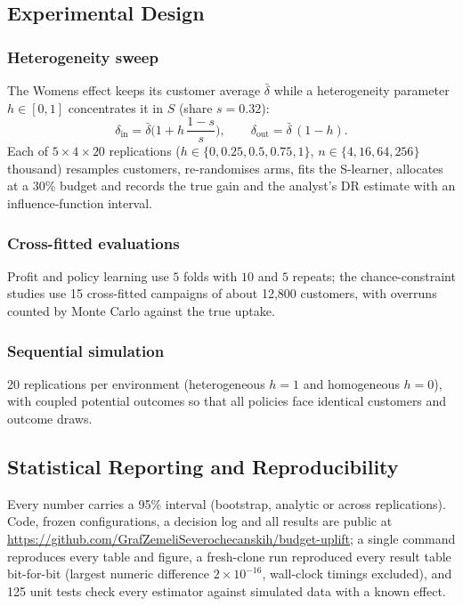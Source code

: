 \documentclass[10pt,twocolumn]{article}
\newcommand{\repourl}{\url{https://github.com/GrafZemeliSeverochecanskih/budget-uplift}}
\begin{document}
\subsection{Experimental Design}
\subsubsection{Heterogeneity sweep}
The Womens effect keeps its customer average $\bar\delta$ while a heterogeneity parameter
$h\in[0,1]$ concentrates it in $S$ (share $s=0.32$):
\begin{equation}
  \delta_{\text{in}} = \bar\delta\Big(1+h\,\frac{1-s}{s}\Big), \qquad \delta_{\text{out}} = \bar\delta\,(1-h).
\end{equation}
Each of $5\times4\times20$ replications ($h\in\{0,0.25,0.5,0.75,1\}$, $n\in\{4,16,64,256\}$ thousand)
resamples customers, re-randomises arms, fits the S-learner, allocates at a 30\% budget and records
the true gain and the analyst's DR estimate with an influence-function interval.
\subsubsection{Cross-fitted evaluations}
Profit and policy learning use $5$ folds with $10$ and $5$ repeats; the chance-constraint studies
use 15 cross-fitted campaigns of about 12{,}800 customers, with overruns counted by Monte Carlo
against the true uptake.
\subsubsection{Sequential simulation}
20 replications per environment (heterogeneous $h=1$ and homogeneous $h=0$), with coupled potential
outcomes so that all policies face identical customers and outcome draws.

\subsection{Statistical Reporting and Reproducibility}
Every number carries a 95\% interval (bootstrap, analytic or across replications). Code, frozen
configurations, a decision log and all results are public at \repourl; a single command reproduces
every table and figure, a fresh-clone run reproduced every result table bit-for-bit (largest numeric
difference $2\times10^{-16}$, wall-clock timings excluded), and 125 unit tests check every estimator
against simulated data with a known effect.

\end{document}
